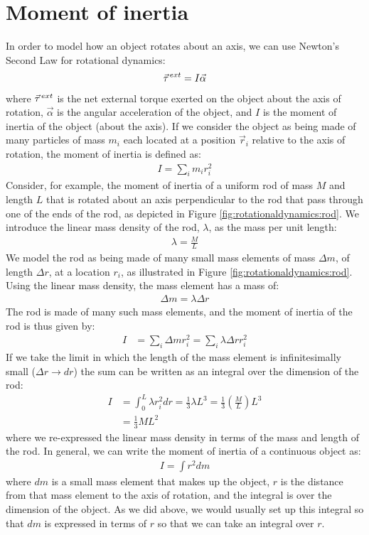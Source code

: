 \section{Moment of inertia}
In order to model how an object rotates about an axis, we can use Newton's Second Law for rotational dynamics:
\begin{align*}
\pvec\tau^{ext} = I \vec \alpha
\end{align*}
where $\pvec\tau^{ext}$ is the net external torque exerted on the object about the axis of rotation, $\vec \alpha$ is the angular acceleration of the object, and $I$ is the moment of inertia of the object (about the axis). If we consider the object as being made of many particles of mass $m_i$ each located at a position $\vec r_i$ relative to the axis of rotation, the moment of inertia is defined as:
\begin{align*}
I = \sum_i m_i r_i^2
\end{align*}
Consider, for example, the moment of inertia of a uniform rod of mass $M$ and length $L$ that is rotated about an axis perpendicular to the rod that pass through one of the ends of the rod, as depicted in Figure \ref{fig:rotationaldynamics:rod}.
We introduce the linear mass density of the rod, $\lambda$, as the mass per unit length:
\begin{align*}
\lambda = \frac{M}{L}
\end{align*}
We model the rod as being made of many small mass elements of mass $\Delta m$, of length $\Delta r$, at a location $r_i$, as illustrated in Figure \ref{fig:rotationaldynamics:rod}. Using the linear mass density, the mass element has a mass of:
\begin{align*}
\Delta m = \lambda \Delta r
\end{align*}
The rod is made of many such mass elements, and the moment of inertia of the rod is thus given by:
\begin{align*}
I &= \sum_i \Delta m r_i^2 =\sum_i \lambda \Delta r r_i^2
\end{align*}
If we take the limit in which the length of the mass element is infinitesimally small ($\Delta r \to dr$) the sum can be written as an integral over the dimension of the rod:
\begin{align*}
I &= \int_0^L\lambda r_i^2dr = \frac{1}{3}\lambda L^3 = \frac{1}{3}\left( \frac{M}{L} \right)L^3 \\
&=\frac{1}{3} ML^2
\end{align*}
where we re-expressed the linear mass density in terms of the mass and length of the rod. In general, we can write the moment of inertia of a continuous object as:
\begin{align*}
I = \int r^2 dm 
\end{align*}
where $dm$ is a small mass element that makes up the object, $r$ is the distance from that mass element to the axis of rotation, and the integral is over the dimension of the object. As we did above, we would usually set up this integral so that $dm$ is expressed in terms of $r$ so that we can take an integral over $r$. 

